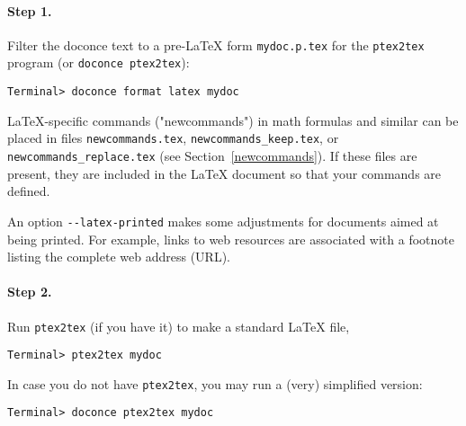\documentclass[%
oneside,                 %
final,                   %
10pt]{article}
\begin{document}
{{{{\paragraph{Step 1.}
Filter the doconce text to a pre-LaTeX form {\fontsize{10pt}{10pt}\Verb!mydoc.p.tex!} for
the {\fontsize{10pt}{10pt}\Verb!ptex2tex!} program (or {\fontsize{10pt}{10pt}\Verb!doconce ptex2tex!}):
\vspace{4pt}
\begin{Verbatim}[numbers=none,frame=lines,label=\fbox{{\tiny Terminal}},fontsize=\fontsize{9pt}{9pt},
labelposition=topline,framesep=2.5mm,framerule=0.7pt]
Terminal> doconce format latex mydoc
\end{Verbatim}
LaTeX-specific commands ("newcommands") in math formulas and similar
can be placed in files {\fontsize{10pt}{10pt}\Verb!newcommands.tex!}, {\fontsize{10pt}{10pt}\Verb!newcommands_keep.tex!}, or
{\fontsize{10pt}{10pt}\Verb!newcommands_replace.tex!} (see Section~\ref{newcommands}).
If these files are present, they are included in the {\LaTeX} document
so that your commands are defined.

An option {\fontsize{10pt}{10pt}\Verb!--latex-printed!} makes some adjustments for documents
aimed at being printed. For example, links to web resources are
associated with a footnote listing the complete web address (URL).

\paragraph{Step 2.}
Run {\fontsize{10pt}{10pt}\Verb!ptex2tex!} (if you have it) to make a standard {\LaTeX} file,
\vspace{4pt}
\begin{Verbatim}[numbers=none,frame=lines,label=\fbox{{\tiny Terminal}},fontsize=\fontsize{9pt}{9pt},
labelposition=topline,framesep=2.5mm,framerule=0.7pt]
Terminal> ptex2tex mydoc
\end{Verbatim}
In case you do not have {\fontsize{10pt}{10pt}\Verb!ptex2tex!}, you may run a (very) simplified version:
\vspace{4pt}
\begin{Verbatim}[numbers=none,frame=lines,label=\fbox{{\tiny Terminal}},fontsize=\fontsize{9pt}{9pt},
labelposition=topline,framesep=2.5mm,framerule=0.7pt]
Terminal> doconce ptex2tex mydoc
\end{Verbatim}

}}}}
\end{document}
